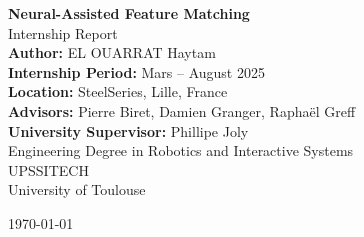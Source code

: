 \documentclass[a4paper,9pt]{report}
\begin{document}

\vspace*{4cm}

\begin{center}
    \Huge \textbf{Neural-Assisted Feature Matching}\\[1.5cm]
    \LARGE Internship Report\\[1.5cm]
    \large \textbf{Author:} EL OUARRAT Haytam\\
    \textbf{Internship Period:} Mars – August 2025\\
    \textbf{Location:} SteelSeries, Lille, France\\[2cm]

    \textbf{Advisors:} Pierre Biret, Damien Granger, Raphaël Greff\\
    \textbf{University Supervisor:} Phillipe Joly \\[2cm]

    \large Engineering Degree in Robotics and Interactive Systems \\
    UPSSITECH \\
    University of Toulouse
\end{center}

\vfill

\begin{center}
    \today
\end{center}
\end{document}
